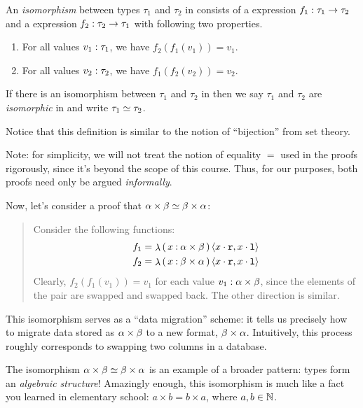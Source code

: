 \documentclass[11pt]{article}
\begin{document}
\begin{defn}
  An \emph{isomorphism} between types $\tau_1$ and $\tau_2$ in \LangPSF{} consists of
  a \LangPSF{} expression ${f_1}\mathrel{:}{{\tau_1}\mathrel{\to}{\tau_2}}$ and
  a \LangPSF{} expression ${f_2}\mathrel{:}{{\tau_2}\mathrel{\to}{\tau_1}}$
with following two properties.
  \begin{enumerate}
  \item For all values ${v_1}\mathrel{:}{\tau_1}$, we have
    $f_2(f_1(v_1)) = v_1$.
  \item For all values ${v_2}\mathrel{:}{\tau_2}$, we have
    $f_1(f_2(v_2)) = v_2$.
  \end{enumerate}
  If there is an isomorphism between $\tau_1$ and $\tau_2$ in
  \LangPSF{} then we say  $\tau_1$ and $\tau_2$ are \emph{isomorphic} in
  \LangPSF{}  and write $\tau_1 \simeq \tau_2$.
\end{defn}

Notice that this definition is similar to the notion of ``bijection'' from set theory.

Note: for simplicity, we will not treat the notion of equality $=$ used in the proofs rigorously, since it's beyond the scope of this course.
Thus, for our purposes, both proofs need only be argued \emph{informally}.

Now, let's consider a proof that ${\alpha}\times{\beta} \simeq {\beta}\times{\alpha}$:
\begin{quote}
  Consider the following functions:
  \begin{align*}
    f_1 &= \mathop{\lambda}\mathtt{(}\,{x}\mathbin{:}{{\alpha}\times{\beta}}\,\mathtt{)}\,{\langle {x}\mathbin\cdot{\ensuremath{\mathtt{r}}}, {x}\mathbin\cdot{\ensuremath{\mathtt{l}}}\rangle} \\
    f_2 &= \mathop{\lambda}\mathtt{(}\,{x}\mathbin{:}{{\beta}\times{\alpha}}\,\mathtt{)}\,{\langle {x}\mathbin\cdot{\ensuremath{\mathtt{r}}}, {x}\mathbin\cdot{\ensuremath{\mathtt{l}}}\rangle}
  \end{align*}
  Clearly, $f_2(f_1(v_1)) = v_1$ for each value $v_1 : {\alpha}\times{\beta}$, since the elements of the pair are swapped and swapped back.
  The other direction is similar.
\end{quote}

This isomorphism serves as a ``data migration'' scheme: it tells us precisely how to migrate data stored as ${\alpha}\times{\beta}$ to a new format, ${\beta}\times{\alpha}$.
Intuitively, this process roughly corresponds to swapping two columns in a database.

The isomorphism ${\alpha}\times{\beta} \simeq {\beta}\times{\alpha}$ is an example of a broader pattern: types form an \emph{algebraic structure}!
Amazingly enough, this isomorphism is much like a fact you learned in elementary school: $a \times b = b \times a$, where $a, b \in \mathbb{N}$.
\end{document}
